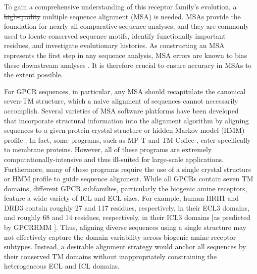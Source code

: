 \documentclass[fleqn,10pt]{wlpeerj}
\providecommand{\DIFaddtex}[1]{{\protect\color{blue}\uwave{#1}}} %
\providecommand{\DIFdeltex}[1]{{\protect\color{red}\sout{#1}}}                      %
\providecommand{\DIFaddbegin}{} %
\providecommand{\DIFaddend}{} %
\providecommand{\DIFdelbegin}{} %
\providecommand{\DIFdelend}{} %
\providecommand{\DIFadd}[1]{\texorpdfstring{\DIFaddtex{#1}}{#1}} %
\providecommand{\DIFdel}[1]{\texorpdfstring{\DIFdeltex{#1}}{}} %
\begin{document}
To gain a comprehensive understanding of this receptor family's evolution, a \DIFdelbegin \DIFdel{high-quality }\DIFdelend \DIFaddbegin \DIFadd{robust }\DIFaddend multiple sequence alignment (MSA) is needed. MSAs provide the foundation for nearly all comparative sequence analyses, and they are commonly used to locate conserved sequence motifs, identify functionally important residues, and investigate evolutionary histories. As constructing an MSA represents the first step in any sequence analysis, MSA errors are known to bias these downstream analyses \citep{Ogden2006, Wong2008, Jordan2012}. It is therefore crucial to ensure accuracy in MSAs to the extent possible. 

For GPCR sequences, in particular, any MSA should recapitulate the canonical seven-TM structure, which a naive alignment of sequences cannot necessarily accomplish. Several varieties of MSA software platforms have been developed that incorporate structural information into the alignment algorithm by aligning sequences to a given protein crystal structure \citep{promals3d, 3dcoffee} or hidden Markov model (HMM) profile \citep{hmmer, Chang2012, Hill2012}. In fact, some programs, such as MP-T \citep{Hill2012} and TM-Coffee \citep{Chang2012}, cater specifically to membrane proteins. However, all of these programs are extremely computationally-intensive and thus ill-suited for large-scale applications. Furthermore, many of these programs require the use of a single crystal structure or HMM profile to guide sequence alignment. While all GPCRs contain seven TM domains, different GPCR subfamilies, particularly the biogenic amine receptors, feature a wide variety of ICL and ECL sizes. For example, human HRH1 and DRD3 contain roughly 27 and 117 residues, respectively, in their ECL3 domains, and roughly 68 and 14 residues, respectively, in their ICL3 domains [as predicted by GPCRHMM \citep{Wistrand2006}]. Thus, aligning diverse sequences using a single structure may not effectively capture the domain variability across biogenic amine receptor subtypes. Instead, a desirable alignment strategy would anchor all sequences by their conserved TM domains without inappropriately constraining the heterogeneous ECL and ICL domains.
\end{document}
